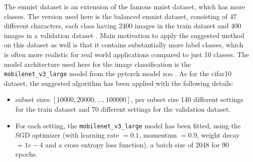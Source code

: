 \documentclass{article} %
\begin{document}
The emnist dataset is an extension of the famous mnist dataset, which has more classes. The version used here is the balanced emnist dataset, consisting of 47 different characters, each class having 2400 images in the train dataset and 400 images in a validation dataset \cite{cohen2017emnist}.  
Main motivation to apply the suggested method on this dataset as well is that it contains substantially more label classes, which is often more realistic for real world applications compared to just 10 classes.
The model architecture used here for the image classification is the \verb|mobilenet_v3_large| model from the pytorch model zoo \cite{howard2019mobilenetv3}.
As for the cifar10 dataset, the suggested algorithm has been applied with the following details:
\begin{itemize}
    \item subset sizes $[10000, 20000, \dots, 100000]$, per subset size 140 different settings for the train dataset and 70 different settings for the validation dataset.
    \item For each setting, the \verb|mobilenet_v3_large| model has been fitted, using the SGD optimizer (with learning rate $=0.1$, momentum $=0.9$, weight decay $=1e-4$ and a cross entropy loss function), a batch size of 2048 for 90 epochs. 
\end{itemize}
\end{document}
